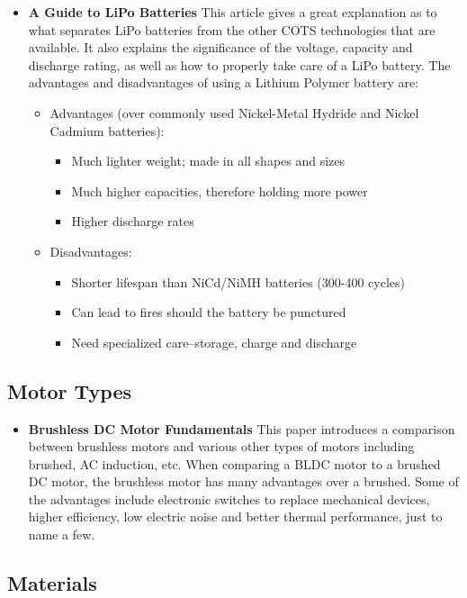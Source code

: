 \documentclass{article}
\begin{document}
\begin{itemize}

\item {\bf A Guide to LiPo Batteries} \cite{Sch} This article gives a great explanation as to what separates LiPo batteries from the other COTS technologies that are available.  It also explains the significance of the voltage, capacity and discharge rating, as well as how to properly take care of a LiPo battery.  The advantages and disadvantages of using a Lithium Polymer battery are:


\begin{itemize}

\item Advantages (over commonly used Nickel-Metal Hydride and Nickel Cadmium batteries):

\begin{itemize}
\item Much lighter weight; made in all shapes and sizes
\item Much higher capacities, therefore holding more power
\item Higher discharge rates
\end{itemize}

\item Disadvantages:

\begin{itemize}
\item Shorter lifespan than NiCd/NiMH batteries (300-400 cycles)
\item Can lead to fires should the battery be punctured
\item Need specialized care--storage, charge and discharge
\end{itemize}

\end{itemize}

\end{itemize}


\subsection{Motor Types}

\begin{itemize}

\item {\bf Brushless DC Motor Fundamentals} \cite{YZ11} This paper introduces a comparison between brushless motors and various other types of motors including brushed, AC induction, etc.  When comparing a BLDC motor to a brushed DC motor, the brushless motor has many advantages over a brushed.  Some of the advantages include electronic switches to replace mechanical devices, higher efficiency, low electric noise and better thermal performance, just to name a few. 
 

\end{itemize}


\subsection{Materials}



%
%


\end{document}
